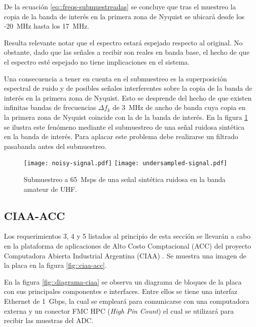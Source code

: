 \documentclass[../../main.tex]{subfiles}
\begin{document}
De la ecuación \ref{eq::freqs-submuestreadas} se concluye que tras el muestreo la copia de la banda de interés en la primera zona de Nyquist se ubicará desde los -20~MHz hasta los 17~MHz. 

Resulta relevante notar que el espectro estará espejado respecto al original. No obstante, dado que las señales a recibir son reales en banda base, el hecho de que el espectro esté espejado no tiene implicaciones en el sistema. 

Una consecuencia a tener en cuenta en el submuestreo es la superposición espectral de ruido y de posibles señales interferentes sobre la copia de la banda de interés en la primera zona de Nyquist. Esto se desprende del hecho de que existen infinitas bandas de frecuencias $\Delta f_k$ de 3~MHz de ancho de banda cuya copia en la primera zona de Nyquist coincide con la de la banda de interés. 
En la figura \ref{fig::undersampling} se ilustra este fenómeno mediante el submuestreo de una señal ruidosa sintética en la banda de interés. Para aplacar este problema debe realizarse un filtrado pasabanda antes del submuestreo.

\begin{figure}[H]
    \centering
    {\texttt{[image: noisy-signal.pdf]}}
    \hspace{\fill}%
    {\texttt{[image: undersampled-signal.pdf]}}
    \caption{Submuestreo a 65~Msps de una señal sintética ruidosa en la banda amateur de UHF.}
    \label{fig::undersampling}
\end{figure}


\subsection{CIAA-ACC}
Los requerimientos 3, 4 y 5 listados al principio de esta sección se llevarán a cabo en la plataforma de aplicaciones de Alto Costo Comptacional (ACC) \cite{CIAA-ACC} del proyecto Computadora Abierta Industrial Argentina (CIAA) \cite{CIAA}. Se muestra una imagen de la placa en la figura \ref{fig::ciaa-acc}.

En la figura \ref{fig::diagrama-ciaa} se observa un diagrama de bloques de la placa con sus principales componentes e interfaces. Entre ellos se tiene una interfaz Ethernet de 1~Gbps, la cual se empleará para comunicarse con una computadora externa y un conector FMC HPC (\textit{High Pin Count}) el cual se utilizará para recibir las muestras del ADC.
\end{document}
